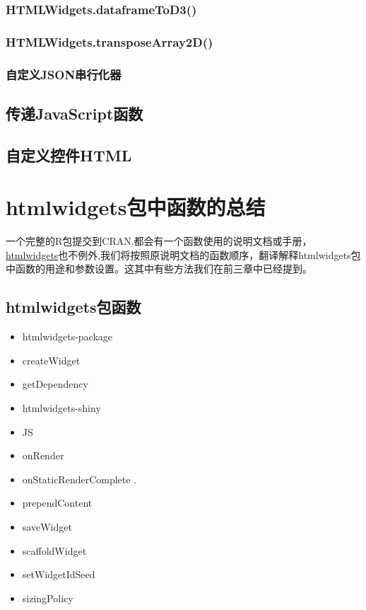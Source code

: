 \documentclass[]{book}
\theoremstyle{definition}
\theoremstyle{definition}
\theoremstyle{definition}
\theoremstyle{remark}
\begin{document}
\subsection{HTMLWidgets.dataframeToD3()}\label{htmlwidgets.dataframetod3}

\subsection{HTMLWidgets.transposeArray2D()}\label{htmlwidgets.transposearray2d}

\subsection{自定义JSON串行化器}\label{json}

\section{传递JavaScript函数}\label{javascript}

\section{自定义控件HTML}\label{html}

\chapter{htmlwidgets包中函数的总结}\label{htmlwidgets-pkgintro}

一个完整的R包提交到CRAN,都会有一个函数使用的说明文档或手册，\href{https://cran.r-project.org/web/packages/htmlwidgets/htmlwidgets.pdf}{htmlwidgets}也不例外,我们将按照原说明文档的函数顺序，翻译解释htmlwidgets包中函数的用途和参数设置。这其中有些方法我们在前三章中已经提到。

\section{htmlwidgets包函数}\label{htmlwidgets}

\begin{itemize}
\item
  htmlwidgets-package
\item
  createWidget
\item
  getDependency
\item
  htmlwidgets-shiny
\item
  JS
\item
  onRender
\item
  onStaticRenderComplete .
\item
  prependContent
\item
  saveWidget
\item
  scaffoldWidget
\item
  setWidgetIdSeed
\item
  sizingPolicy
\end{itemize}
\end{document}
